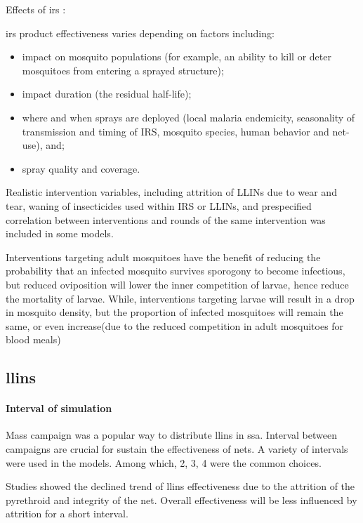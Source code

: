 \documentclass[a4paper, 12pt, twoside]{article}
\begin{document}
Effects of \gls{irs} \cite{Sherrard-Smith2018b}:

\gls{irs} product effectiveness varies depending on factors including:

\begin{itemize}
	\item impact on mosquito populations (for example, an ability to kill or deter mosquitoes from entering a sprayed structure);
	\item impact duration (the residual half-life);
	\item where and when sprays are deployed (local malaria endemicity, seasonality of transmission and timing of IRS, mosquito species, human behavior and net-use), and;
	\item spray quality and coverage.
\end{itemize}

Realistic intervention variables, including attrition of LLINs due to wear and tear, waning of insecticides used within IRS or LLINs, and prespecified correlation between interventions and rounds of the same intervention was included in some models\cite{Walker2016}.

Interventions targeting adult mosquitoes have the benefit of reducing the probability that an infected mosquito survives sporogony to become infectious, but reduced oviposition will lower the inner competition of larvae, hence reduce the mortality of larvae.
While, interventions targeting larvae will result in a drop in mosquito density, but the proportion of infected mosquitoes will remain the same, or even increase(due to the reduced competition in adult mosquitoes for blood meals)

\subsection{\texorpdfstring{\gls{llins}}{LLINs}}%
\label{sub:llins}

\paragraph{Interval of simulation}%
\label{par:interval_of_simulation}
Mass campaign was a popular way to distribute \gls{llins} in \gls{ssa}.
Interval between campaigns are crucial for sustain the effectiveness of nets.
A variety of intervals were used in the models.
Among which, 2, 3, 4\cite{Walker2016} were the common choices.

Studies showed the declined trend of \gls{llins} effectiveness due to the attrition of the pyrethroid and integrity of the net.
Overall effectiveness will be less influenced by attrition for a short interval.
\end{document}
